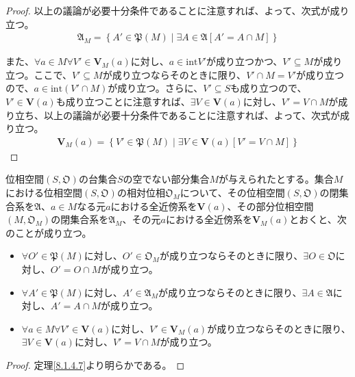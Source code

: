 \documentclass[dvipdfmx]{jsarticle}
\begin{document}
\begin{proof}
以上の議論が必要十分条件であることに注意すれば、よって、次式が成り立つ。
\begin{align*}
\mathfrak{A}_{M} = \left\{ A'\in \mathfrak{P}(M) \middle| \exists A \in \mathfrak{A}\left[ A' = A \cap M \right] \right\}
\end{align*}\par
また、$\forall a \in M\forall V' \in \mathbf{V}_{M}(a)$に対し、$a \in {\mathrm{int}}V'$が成り立つかつ、$V' \subseteq M$が成り立つ。ここで、$V' \subseteq M$が成り立つならそのときに限り、$V' \cap M = V'$が成り立つので、$a \in {\mathrm{int}}\left( V' \cap M \right)$が成り立つ。さらに、$V' \subseteq S$も成り立つので、$V' \in \mathbf{V}(a)$も成り立つことに注意すれば、$\exists V \in \mathbf{V}(a)$に対し、$V' = V \cap M$が成り立ち、以上の議論が必要十分条件であることに注意すれば、よって、次式が成り立つ。
\begin{align*}
\mathbf{V}_{M}(a) = \left\{ V'\in \mathfrak{P}(M) \middle| \exists V \in \mathbf{V}(a)\left[ V' = V \cap M \right] \right\}
\end{align*}
\end{proof}
\begin{thm}\label{8.1.4.8}
位相空間$\left( S,\mathfrak{O} \right)$の台集合$S$の空でない部分集合$M$が与えられたとする。集合$M$における位相空間$\left( S,\mathfrak{O} \right)$の相対位相$\mathfrak{O}_{M}$について、その位相空間$\left( S,\mathfrak{O} \right)$の閉集合系を$\mathfrak{A}$、$a \in M$なる元$a$における全近傍系を$\mathbf{V}(a)$、その部分位相空間$\left( M,\mathfrak{O}_{M} \right)$の閉集合系を$\mathfrak{A}_{M}$、その元$a$における全近傍系を$\mathbf{V}_{M}(a)$とおくと、次のことが成り立つ。
\begin{itemize}
\item
  $\forall O'\in \mathfrak{P}(M)$に対し、$O' \in \mathfrak{O}_{M}$が成り立つならそのときに限り、$\exists O \in \mathfrak{O}$に対し、$O' = O \cap M$が成り立つ。
\item
  $\forall A'\in \mathfrak{P}(M)$に対し、$A' \in \mathfrak{A}_{M}$が成り立つならそのときに限り、$\exists A \in \mathfrak{A}$に対し、$A' = A \cap M$が成り立つ。
\item
  $\forall a \in M\forall V' \in \mathbf{V}(a)$に対し、$V' \in \mathbf{V}_{M}(a)$が成り立つならそのときに限り、$\exists V \in \mathbf{V}(a)$に対し、$V' = V \cap M$が成り立つ。
\end{itemize}
\end{thm}
\begin{proof} 定理\ref{8.1.4.7}より明らかである。
\end{proof}
\end{document}
